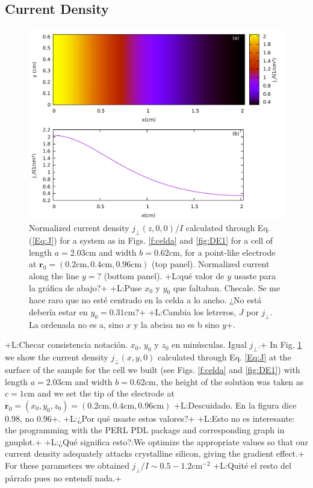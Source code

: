 \documentclass{article}
\newcommand{\notaL}[1]{{\color{blue}+L:#1+}}
\begin{document}
\subsection{Current Density}
\label{sec:current-density}
\begin{figure}
  \centering
  \includegraphics[width=\textwidth]{Images/G123}
  \caption{Normalized current density $j_\perp(z,0,0)/I$ calculated through
    Eq. (\ref{Eq:J}) for a
    system as in Figs. \ref{f:celda} and \ref{fig:DE1} for a cell of
    length $a = 2.03\text{cm}$ and width $b=0.62\text{cm}$, for a
    point-like electrode at $\bm r_0=(0.2\text{cm},
    0.4\text{cm},0.96\text{cm})$ (top panel). Normalized current
    along the line $y=?$ (bottom panel). \notaL{qué valor de $y$ usaste para la
      gráfica de abajo?} \notaL{Puse $x_0$
      y $y_0$ que faltaban. Checale. Se me hace raro que no esté
      centrado en la celda a lo ancho. ¿No está debería estar en
      $y_0=0.31\text{cm}?$} \notaL{Cambia los letreros, $J$ por
      $j_\perp$. La ordenada no es a, sino $x$ y la abcisa no es b
      sino $y$}. }
  \label{fig:DR1}
\end{figure}
\notaL{Checar consistencia notación. $x_0$, $y_0$ y $z_0$ en
  minúsculas. Igual $j_\perp$.}
In Fig. \ref{fig:DR1} we show the current density $j_\perp(x,y,0)$ calculated through
Eq. \eqref{Eq:J} at the surface of the sample for the cell we built
(see Figs. \ref{f:celda} and \ref{fig:DE1}) with length
$a=2.03\text{cm}$ and width $b = 0.62\text{cm}$, the height of the
solution was taken as $c=1\text{cm}$ and we set the tip of the
electrode at $\bm
r_0=(x_0,y_0,z_0)=(0.2\text{cm},0.4\text{cm},0.96\text{cm})$
\notaL{Descuidado. En la figura dice 0.98, no 0.96}.
\notaL{¿Por qué usaste estos valores?}
\notaL{Esto no es interesante: the programming with the
  PERL PDL package and corresponding graph in gnuplot.}
\notaL{¿Qué significa esto?:We optimize the
appropriate values so that our current density adequately attacks
crystalline silicon, giving the gradient effect.}
For these parameters we obtained $ j_\perp/I\sim
0.5-1.2\text{cm}^{-2}$
\notaL{Quité el resto del párrafo pues no entendí nada.}
\end{document}

